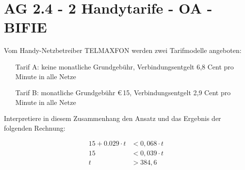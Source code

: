 \section{AG 2.4 - 2 Handytarife  - OA - BIFIE}

\begin{beispiel}[AG 2.4]{1} %
Vom Handy-Netzbetreiber TELMAXFON werden zwei Tarifmodelle angeboten: \\
\begin{itemize}
	\item[Tarif A:] keine monatliche Grundgebühr,
 Verbindungsentgelt 6,8 Cent pro Minute in alle Netze
\item[Tarif B:] monatliche Grundgebühr \euro\,15,
 Verbindungsentgelt 2,9 Cent pro Minute in alle Netze
\end{itemize}

Interpretiere in diesem Zusammenhang den Ansatz und das Ergebnis der folgenden Rechnung:

\begin{align*}
15 + 0.029\cdot t &< 0,068\cdot t \\
15 &< 0,039\cdot t \\
t&>384,6
\end{align*}

\end{beispiel}